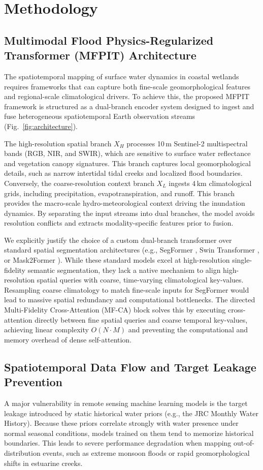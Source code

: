\documentclass[preprint,12pt]{elsarticle}
\begin{document}
\section{Methodology}

\subsection{Multimodal Flood Physics-Regularized Transformer (MFPIT) Architecture}
The spatiotemporal mapping of surface water dynamics in coastal wetlands requires frameworks that can capture both fine-scale geomorphological features and regional-scale climatological drivers. To achieve this, the proposed MFPIT framework is structured as a dual-branch encoder system designed to ingest and fuse heterogeneous spatiotemporal Earth observation streams (Fig.~\ref{fig:architecture}). 

The high-resolution spatial branch $X_H$ processes 10\,m Sentinel-2 multispectral bands (RGB, NIR, and SWIR), which are sensitive to surface water reflectance and vegetation canopy signatures. This branch captures local geomorphological details, such as narrow intertidal tidal creeks and localized flood boundaries. Conversely, the coarse-resolution context branch $X_L$ ingests 4\,km climatological grids, including precipitation, evapotranspiration, and runoff. This branch provides the macro-scale hydro-meteorological context driving the inundation dynamics. By separating the input streams into dual branches, the model avoids resolution conflicts and extracts modality-specific features prior to fusion.

We explicitly justify the choice of a custom dual-branch transformer over standard spatial segmentation architectures (e.g., SegFormer \cite{xie_segformer_2021}, Swin Transformer \cite{liu_swin_2021}, or Mask2Former \cite{cheng_masked_2022}). While these standard models excel at high-resolution single-fidelity semantic segmentation, they lack a native mechanism to align high-resolution spatial queries with coarse, time-varying climatological key-values. Resampling coarse climatology to match fine-scale inputs for SegFormer would lead to massive spatial redundancy and computational bottlenecks. The directed Multi-Fidelity Cross-Attention (MF-CA) block solves this by executing cross-attention directly between fine spatial queries and coarse temporal key-values, achieving linear complexity $O(N \cdot M)$ and preventing the computational and memory overhead of dense self-attention.

\subsection{Spatiotemporal Data Flow and Target Leakage Prevention}
A major vulnerability in remote sensing machine learning models is the target leakage introduced by static historical water priors (e.g., the JRC Monthly Water History). Because these priors correlate strongly with water presence under normal seasonal conditions, models trained on them tend to memorize historical boundaries. This leads to severe performance degradation when mapping out-of-distribution events, such as extreme monsoon floods or rapid geomorphological shifts in estuarine creeks.
\end{document}
